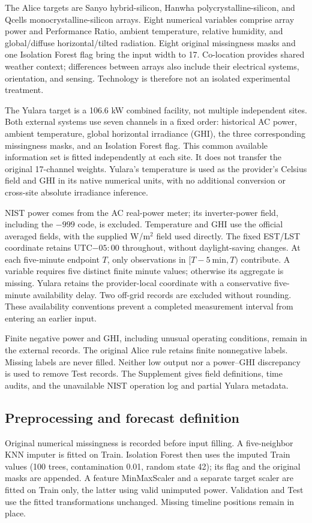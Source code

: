 \documentclass[aip,reprint,floatfix,amsmath,amssymb]{revtex4-2}
\begin{document}
The Alice targets are Sanyo hybrid-silicon, Hanwha polycrystalline-silicon, and Qcells monocrystalline-silicon arrays.\cite{DKASC2026,Wang2019DKASC} Eight numerical variables comprise array power and Performance Ratio, ambient temperature, relative humidity, and global/diffuse horizontal/tilted radiation. Eight original missingness masks and one Isolation Forest flag bring the input width to 17. Co-location provides shared weather context; differences between arrays also include their electrical systems, orientation, and sensing. Technology is therefore not an isolated experimental treatment.

The Yulara target is a 106.6 kW combined facility, not multiple independent sites.\cite{YularaData} Both external systems use seven channels in a fixed order: historical AC power, ambient temperature, global horizontal irradiance (GHI), the three corresponding missingness masks, and an Isolation Forest flag. This common available information set is fitted independently at each site. It does not transfer the original 17-channel weights. Yulara's temperature is used as the provider's Celsius field and GHI in its native numerical units, with no additional conversion or cross-site absolute irradiance inference.

NIST power comes from the AC real-power meter; its inverter-power field, including the $-999$ code, is excluded. Temperature and GHI use the official averaged fields, with the supplied W/m$^2$ field used directly.\cite{Boyd2017NIST,NISTDictionary,NISTData} The fixed EST/LST coordinate retains UTC$-05{:}00$ throughout, without daylight-saving changes. At each five-minute endpoint $T$, only observations in $[T-5\mathrm{\ min},T)$ contribute. A variable requires five distinct finite minute values; otherwise its aggregate is missing. Yulara retains the provider-local coordinate with a conservative five-minute availability delay. Two off-grid records are excluded without rounding. These availability conventions prevent a completed measurement interval from entering an earlier input.

Finite negative power and GHI, including unusual operating conditions, remain in the external records. The original Alice rule retains finite nonnegative labels. Missing labels are never filled. Neither low output nor a power--GHI discrepancy is used to remove Test records. The Supplement gives field definitions, time audits, and the unavailable NIST operation log and partial Yulara metadata.

\subsection{Preprocessing and forecast definition}
Original numerical missingness is recorded before input filling. A five-neighbor KNN imputer is fitted on Train. Isolation Forest then uses the imputed Train values (100 trees, contamination 0.01, random state 42); its flag and the original masks are appended. A feature MinMaxScaler and a separate target scaler are fitted on Train only, the latter using valid unimputed power.\cite{Troyanskaya2001,Liu2008Isolation} Validation and Test use the fitted transformations unchanged. Missing timeline positions remain in place.
\end{document}
